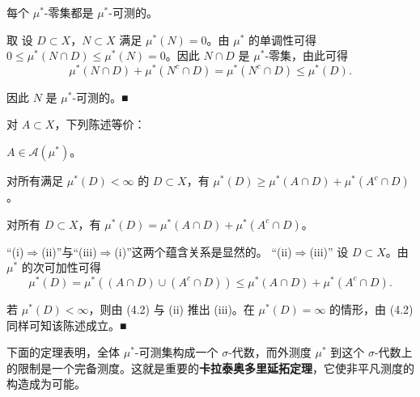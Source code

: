 \begin{remark}

\begin{items}
\item

每个 $ \mu^* $-零集都是 $ \mu^* $-可测的。

\proofhead
取 设 $ D \subset X $，$ N \subset X $ 满足 $ \mu^*(N) = 0 $。由 $ \mu^* $ 的单调性可得 $ 0 \le \mu^*(N \cap D) \le \mu^*(N) = 0 $。因此 $ N \cap D $ 是 $ \mu^* $-零集，由此可得
\[
\mu^*(N \cap D) + \mu^*(N^c \cap D) = \mu^*(N^c \cap D) \le \mu^*(D) .
\]

因此 $ N $ 是 $ \mu^* $-可测的。\nobreak\hspace{0.35em}■

\item

对 $ A \subset X $，下列陈述等价：

\end{items}

\begin{subitems}
\item

$ A \in \mathcal{A}(\mu^*) $。

\item

对所有满足 $ \mu^*(D) < \infty $ 的 $ D \subset X $，有 $ \mu^*(D) \ge \mu^*(A \cap D) + \mu^*(A^c \cap D) $。

\item

对所有 $ D \subset X $，有 $ \mu^*(D) = \mu^*(A \cap D) + \mu^*(A^c \cap D) $。

\proofhead
“(i)$ \Rightarrow $(ii)”与“(iii)$ \Rightarrow $(i)”这两个蕴含关系是显然的。
“(ii)$ \Rightarrow $(iii)” 设 $ D \subset X $。由 $ \mu^* $ 的次可加性可得
\begin{equation}
\mu^*(D) = \mu^*((A \cap D) \cup (A^c \cap D)) \le \mu^*(A \cap D) + \mu^*(A^c \cap D) .\tag{4.2}
\end{equation}

若 $ \mu^*(D) < \infty $，则由 (4.2) 与 (ii) 推出 (iii)。在 $ \mu^*(D) = \infty $ 的情形，由 (4.2) 同样可知该陈述成立。\nobreak\hspace{0.35em}■

\end{subitems}

下面的定理表明，全体 $ \mu^* $-可测集构成一个 $ \sigma $-代数，而外测度 $ \mu^* $ 到这个 $ \sigma $-代数上的限制是一个完备测度。这就是重要的\textbf{卡拉泰奥多里延拓定理}，它使非平凡测度的构造成为可能。

\end{remark}

